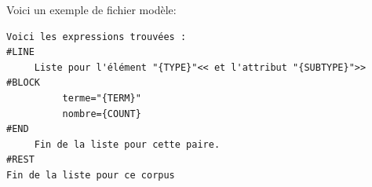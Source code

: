 \noindent Voici un exemple de fichier modèle:
\begin{verbatim}
Voici les expressions trouvées :
#LINE
     Liste pour l'élément "{TYPE}"<< et l'attribut "{SUBTYPE}">>
#BLOCK
          terme="{TERM}"
          nombre={COUNT}
#END
     Fin de la liste pour cette paire.
#REST
Fin de la liste pour ce corpus
\end{verbatim}

